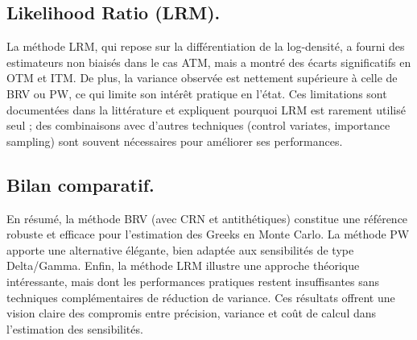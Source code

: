 \documentclass[a4paper,11pt]{article}
\begin{document}
\subsection{Likelihood Ratio (LRM).}
La méthode LRM, qui repose sur la différentiation de la log-densité, a
fourni des estimateurs non biaisés dans le cas ATM, mais a montré des
écarts significatifs en OTM et ITM. De plus, la variance observée est
nettement supérieure à celle de BRV ou PW, ce qui limite son intérêt
pratique en l’état. Ces limitations sont documentées dans la littérature
et expliquent pourquoi LRM est rarement utilisé seul ; des combinaisons
avec d’autres techniques (control variates, importance sampling) sont
souvent nécessaires pour améliorer ses performances.

\subsection{Bilan comparatif.}
En résumé, la méthode BRV (avec CRN et antithétiques) constitue une
référence robuste et efficace pour l’estimation des Greeks en Monte
Carlo. La méthode PW apporte une alternative élégante, bien adaptée aux
sensibilités de type Delta/Gamma. Enfin, la méthode LRM illustre une
approche théorique intéressante, mais dont les performances pratiques
restent insuffisantes sans techniques complémentaires de réduction de
variance. Ces résultats offrent une vision claire des compromis entre
précision, variance et coût de calcul dans l’estimation des sensibilités.
\end{document}
